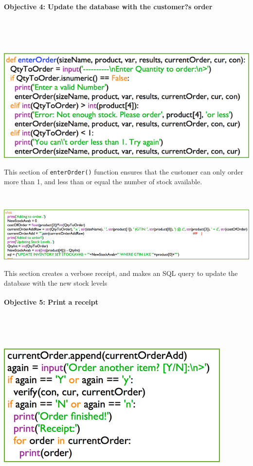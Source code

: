 \documentclass[a4paper]{article}
\begin{document}
\paragraph{Objective 4: Update the database with the customer?s order} ~\par ~\par
\noindent\includegraphics{task2_obj4_1.png} \par 
This section of \verb|enterOrder()| function ensures that the customer can only order more than 1, and less than or equal the number of stock available. ~\par ~\par
\noindent\includegraphics{task2_obj4_2.png} \par
This section creates a verbose receipt, and makes an SQL query to update the database with the new stock levels
\paragraph{Objective 5: Print a receipt} ~\par ~\par
\noindent\includegraphics{task2_obj5_1.png} \par 
\end{document}
